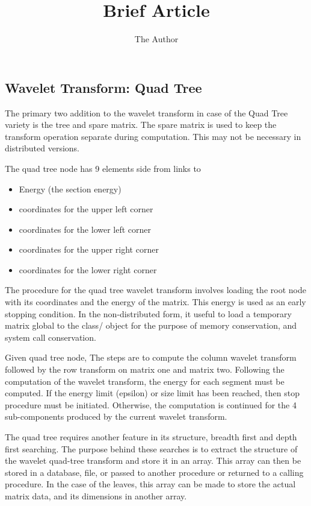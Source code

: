 \documentclass[11pt]{article}
\title{Brief Article}
\author{The Author}
\begin{document}
\maketitle


\subsection {Wavelet Transform: Quad Tree}
 The primary two addition to the wavelet transform in case of the Quad Tree variety is the tree and spare matrix.  The spare matrix is used to keep the transform operation separate during computation.  This may not be necessary in distributed versions.  

The quad tree node has 9 elements side from links to 
\begin {itemize}
\item Energy (the section energy)
\item coordinates for the upper left corner
\item coordinates for the lower left corner
\item coordinates for the upper right corner
\item coordinates for the lower right corner 
\end{itemize}

The procedure for the quad tree wavelet transform involves loading the root node with its coordinates and the energy of the matrix.   This energy is used as an early stopping condition.  In the non-distributed form, it useful to load a temporary matrix global to the class/ object for the purpose of memory conservation, and system call conservation.  

Given quad tree node, The steps are to compute the column wavelet transform followed by the row transform on matrix one and matrix two.  Following the computation of the wavelet transform, the energy for each segment must be computed.  If the energy limit (epsilon) or size limit has been reached, then stop procedure must be initiated.  Otherwise, the computation is continued for the 4 sub-components produced by the current wavelet transform.  

 The quad tree requires another feature in its structure, breadth first and depth first searching.  The purpose behind these searches is to extract the structure of the wavelet quad-tree transform and store it in an array.  This array can then be stored in a database, file, or passed to another procedure or returned to a calling procedure.  In the case of the leaves, this array can be made to store the actual matrix data, and its dimensions in another array.  
\end{document}
